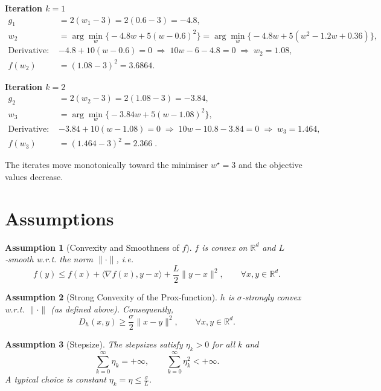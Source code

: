 \documentclass[11pt]{article}
\newtheorem{assumption}{Assumption}
\newcommand{\grad}{\nabla}
\newcommand{\D}{D_{h}}
\newcommand{\inner}[2]{\langle #1,#2\rangle}
\newcommand{\R}{\mathbb{R}}
\begin{document}
\textbf{Iteration $k=1$}
\begin{align*}
g_{1}&=2(w_{1}-3)=2(0.6-3)=-4.8,\\[4pt]
w_{2}&=\arg\min_{w}\Big\{-4.8w+5(w-0.6)^{2}\Big\}
      =\arg\min_{w}\big\{-4.8w+5(w^{2}-1.2w+0.36)\big\},\\
\text{Derivative: }&-4.8+10(w-0.6)=0\;\Rightarrow\;10w-6-4.8=0\;\Rightarrow\;w_{2}=1.08,\\
f(w_{2})&=(1.08-3)^{2}=3.6864.
\end{align*}

\textbf{Iteration $k=2$}
\begin{align*}
g_{2}&=2(w_{2}-3)=2(1.08-3)=-3.84,\\[4pt]
w_{3}&=\arg\min_{w}\Big\{-3.84w+5(w-1.08)^{2}\Big\},\\
\text{Derivative: }&-3.84+10(w-1.08)=0\;\Rightarrow\;10w-10.8-3.84=0\;\Rightarrow\;w_{3}=1.464,\\
f(w_{3})&=(1.464-3)^{2}=2.366\;.
\end{align*}

The iterates move monotonically toward the minimiser $w^{\star}=3$ and the objective values decrease.

\newpage
\section*{Assumptions}
\begin{assumption}[Convexity and Smoothness of $f$]\label{as:convex}
$f$ is convex on $\R^{d}$ and $L$‑smooth w.r.t. the norm $\|\cdot\|$, i.e.
\[
f(y)\le f(x)+\inner{\grad f(x)}{y-x}+\frac{L}{2}\|y-x\|^{2},
\qquad\forall x,y\in\R^{d}.
\tag{A1}
\]
\end{assumption}
\begin{assumption}[Strong Convexity of the Prox‑function]\label{as:strong}
$h$ is $\sigma$‑strongly convex w.r.t. $\|\cdot\|$ (as defined above). Consequently,
\[
\D(x,y)\ge\frac{\sigma}{2}\|x-y\|^{2},\qquad\forall x,y\in\R^{d}.
\tag{A2}
\]
\end{assumption}
\begin{assumption}[Stepsize]\label{as:stepsize}
The stepsizes satisfy $\eta_{k}>0$ for all $k$ and
\[
\sum_{k=0}^{\infty}\eta_{k}=+\infty,\qquad
\sum_{k=0}^{\infty}\eta_{k}^{2}<+\infty .
\tag{A3}
\]
A typical choice is constant $\eta_{k}=\eta\le \frac{\sigma}{L}$.
\end{assumption}
\end{document}
